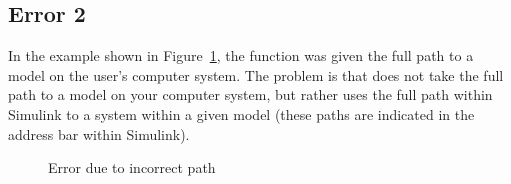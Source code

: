 \documentclass{mcscert}
\newcommand{\simulink}{Simulink}
\begin{document}
	\subsection*{Error 2}
	In the example shown in Figure~\ref{fig:error2}, the  function was given the full path to a model on the user's computer system. 
	The problem is that  does not take the full path to a model on your computer system, but rather uses the full path within \simulink{} to a system within a given model (these paths are indicated in the address bar within \simulink{}).
	\begin{figure}\centering
		\caption{Error due to incorrect path}
		\label{fig:error2}
	\end{figure}
\end{document}
